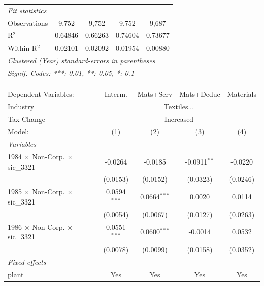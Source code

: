\documentclass[
  12pt]{article}
\theoremstyle{definition}
\theoremstyle{remark}
\begin{document}
\begin{table}
\begin{minipage}{\linewidth}
\begin{tabular}{lcccc}
   \midrule
   \emph{Fit statistics}\\
   Observations                                  & 9,752          & 9,752          & 9,752          & 9,687\\  
   R$^2$                                         & 0.64846        & 0.66263        & 0.74604        & 0.73677\\  
   Within R$^2$                                  & 0.02101        & 0.02092        & 0.01954        & 0.00880\\  
   \midrule \midrule
   \multicolumn{5}{l}{\emph{Clustered (Year) standard-errors in parentheses}}\\
   \multicolumn{5}{l}{\emph{Signif. Codes: ***: 0.01, **: 0.05, *: 0.1}}\\
\end{tabular}
\par\endgroup
\begingroup
\centering
\begin{tabular}{lcccc}
   \tabularnewline \midrule \midrule
   Dependent Variables:                          & Interm.        & Mats+Serv      & Mats+Deduc     & Materials\\  
   Industry & \multicolumn{4}{c}{Textiles...} \\ 
   Tax Change & \multicolumn{4}{c}{Increased} \\ 
   Model:                                        & (1)            & (2)            & (3)            & (4)\\  
   \midrule
   \emph{Variables}\\
   1984 $\times$ Non-Corp. $\times$ sic\_3321    & -0.0264        & -0.0185        & -0.0911$^{**}$ & -0.0220\\   
                                                 & (0.0153)       & (0.0152)       & (0.0323)       & (0.0246)\\   
   1985 $\times$ Non-Corp. $\times$ sic\_3321    & 0.0594$^{***}$ & 0.0664$^{***}$ & 0.0020         & 0.0114\\   
                                                 & (0.0054)       & (0.0067)       & (0.0127)       & (0.0263)\\   
   1986 $\times$ Non-Corp. $\times$ sic\_3321    & 0.0551$^{***}$ & 0.0600$^{***}$ & -0.0014        & 0.0532\\   
                                                 & (0.0078)       & (0.0099)       & (0.0158)       & (0.0352)\\   
   \midrule
   \emph{Fixed-effects}\\
   plant                                         & Yes            & Yes            & Yes            & Yes\\  

\end{tabular}
\end{minipage}
\end{table}
\end{document}
